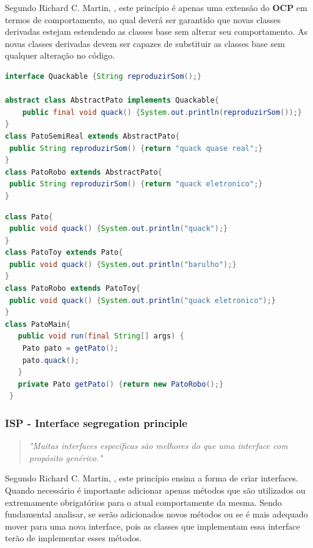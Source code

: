 \documentclass[12pt]{article}
\begin{document}
Segundo Richard C. Martin, \cite{ROBERT_MARTIN_THE_CLEAN_ARCHITECTURE}, este princípio é apenas uma extensão do \textbf{OCP} em termos de comportamento, no qual deverá ser garantido que novas classes derivadas estejam estendendo as classes base sem alterar seu comportamento. As novas classes derivadas devem ser capazes de substituir as classes base sem qualquer alteração no código.

\begin{lstlisting}[caption=Exemplo em conformidade ao LSP,language=java]
interface Quackable {String reproduzirSom();}

abstract class AbstractPato implements Quackable{
    public final void quack() {System.out.println(reproduzirSom());}
}
class PatoSemiReal extends AbstractPato{
 public String reproduzirSom() {return "quack quase real";}
}
class PatoRobo extends AbstractPato{
 public String reproduzirSom() {return "quack eletronico";}
}
\end{lstlisting}

\begin{lstlisting}[caption=Exemplo de violação ao LSP,language=java]
class Pato{
 public void quack() {System.out.println("quack");}
}
class PatoToy extends Pato{
 public void quack() {System.out.println("barulho");}
}
class PatoRobo extends PatoToy{
 public void quack() {System.out.println("quack eletronico");}
}
class PatoMain{
   public void run(final String[] args) {
    Pato pato = getPato();
    pato.quack();
   }
   private Pato getPato() {return new PatoRobo();}
 }
\end{lstlisting}

\subsubsection{ISP - Interface segregation principle}
\begin{quote}
	\textit{"Muitas interfaces específicas são melhores do que uma interface com propósito genérico."}
\end{quote}

Segundo Richard C. Martin, \cite{ROBERT_MARTIN_THE_CLEAN_ARCHITECTURE}, este princípio ensina a forma de criar interfaces. Quando necessário é importante adicionar apenas métodos que são utilizados ou extremamente obrigatórios para o atual comportamente da mesma. Sendo fundamental analisar, se serão adicionados novos métodos ou se é mais adequado mover para uma nova interface, pois as classes que implementam essa interface terão de implementar esses métodos.
\end{document}
